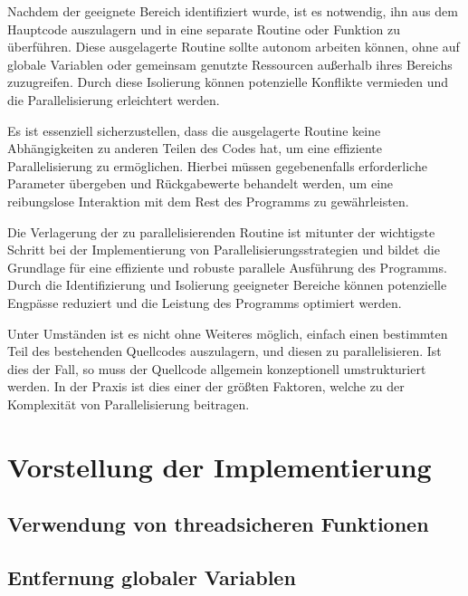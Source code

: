 Nachdem der geeignete Bereich identifiziert wurde, ist es notwendig, ihn aus dem Hauptcode auszulagern und in eine separate Routine oder Funktion zu überführen. Diese ausgelagerte Routine sollte autonom arbeiten können, ohne auf globale Variablen oder gemeinsam genutzte Ressourcen außerhalb ihres Bereichs zuzugreifen. Durch diese Isolierung können potenzielle Konflikte vermieden und die Parallelisierung erleichtert werden.

Es ist essenziell sicherzustellen, dass die ausgelagerte Routine keine Abhängigkeiten zu anderen Teilen des Codes hat, um eine effiziente Parallelisierung zu ermöglichen. Hierbei müssen gegebenenfalls erforderliche Parameter übergeben und Rückgabewerte behandelt werden, um eine reibungslose Interaktion mit dem Rest des Programms zu gewährleisten.

Die Verlagerung der zu parallelisierenden Routine ist mitunter der wichtigste Schritt bei der Implementierung von Parallelisierungsstrategien und bildet die Grundlage für eine effiziente und robuste parallele Ausführung des Programms. Durch die Identifizierung und Isolierung geeigneter Bereiche können potenzielle Engpässe reduziert und die Leistung des Programms optimiert werden.

Unter Umständen ist es nicht ohne Weiteres möglich, einfach einen bestimmten Teil des bestehenden Quellcodes auszulagern, und diesen zu parallelisieren. Ist dies der Fall, so muss der Quellcode allgemein konzeptionell umstrukturiert werden. In der Praxis ist dies einer der größten Faktoren, welche zu der Komplexität von Parallelisierung beitragen.

\section{Vorstellung der Implementierung}
\label{sec:Vorstellung_Implementierung}

\subsection{Verwendung von threadsicheren Funktionen}
\label{sec:Verwendung_threadsichere_Funktionen}

\subsection{Entfernung globaler Variablen}
\label{sec:Entfernung_globaler_Variablen}